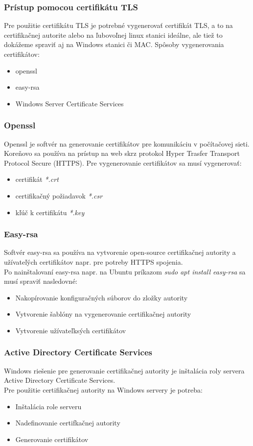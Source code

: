 \subsubsection{Prístup pomocou certifikátu TLS}
Pre použitie certifikátu TLS je potrebné vygenerovať certifikát TLS, a to na certifikačnej autorite alebo na ľubovoľnej linux stanici ideálne, ale tiež to dokážeme spraviť aj na Windows stanici či MAC. 
Spôsoby vygenerovania certifikátov:
\begin{itemize}
\item openssl
\item easy-rsa 
\item Windows Server Certificate Services
\end{itemize}
\subsubsection{Openssl}
Openssl \cite{OpenSSL} je softvér na generovanie certifikátov pre komunikáciu v počítačovej sieti. Koreňovo sa používa na prístup na web skrz protokol Hyper Trasfer Transport Protocol Secure (HTTPS). Pre vygenerovanie certifikátov sa musí vygenerovať: \begin{itemize}
\item certifikát \textit{*.crt}
\item certifikačný požiadavok \textit{*.csr}
\item kľúč k certifikátu \textit{*.key}
\end{itemize}
\subsubsection{Easy-rsa}
Softvér easy-rsa \cite{EasyRSA} sa používa na vytvorenie open-source certifikačnej autority a užívateľých certifikátov napr. pre potreby HTTPS spojenia.\\
Po nainštalovaní easy-rsa napr. na Ubuntu príkazom \textit{sudo apt install easy-rsa} sa musí spraviť nasledovné: \begin{itemize}
\item Nakopírovanie konfiguračných súborov do zložky autority
\item Vytvorenie šablóny na vygenerovanie certifikačnej autority
\item Vytvorenie užívateľksých certifikátov
\end{itemize}
\subsubsection{Active Directory Certificate Services}
Windows riešenie \cite{WindowsCA} pre generovanie  certifikačnej autority je inštalácia roly servera Active Directory Certificate Services. \\
Pre použitie certifikačnej autority na Windows servery je potreba:
\begin{itemize}
\item Inštalácia role serveru
\item Nadefinovanie certifkačnej autority
\item Generovanie certifikátov
\end{itemize}
